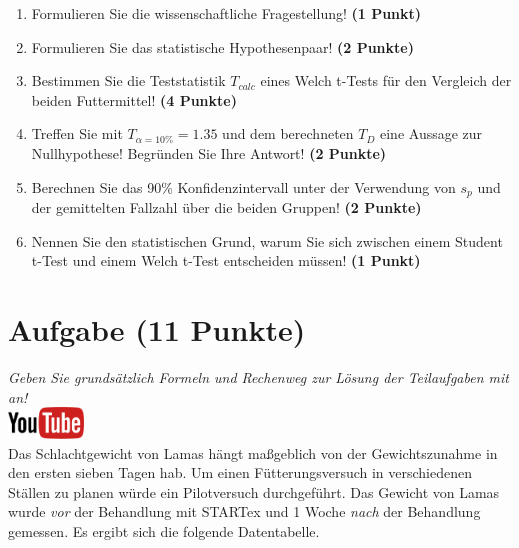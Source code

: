 \documentclass[a4paper, 9pt]{scrartcl}\usepackage[]{graphicx}\usepackage[]{xcolor}
\begin{document}
\begin{enumerate}
  \item Formulieren Sie die wissenschaftliche Fragestellung! \textbf{(1 Punkt)}
  \item Formulieren Sie das statistische Hypothesenpaar! \textbf{(2
      Punkte)}
  \item Bestimmen Sie die Teststatistik $T_{calc}$ eines Welch t-Tests f{\"u}r den
  Vergleich der beiden Futtermittel! \textbf{(4 Punkte)}
\item Treffen Sie mit $T_{\alpha = 10\%} = 1.35$ und dem berechneten $T_{D}$ eine Aussage
  zur Nullhypothese! Begr{\"u}nden Sie Ihre Antwort! \textbf{(2 Punkte)}
\item Berechnen Sie das 90\% Konfidenzintervall unter der
  Verwendung von $s_p$ und der gemittelten Fallzahl {\"u}ber die beiden Gruppen! \textbf{(2 Punkte)}
\item Nennen Sie den statistischen Grund, warum Sie sich zwischen einem Student t-Test und einem
  Welch t-Test entscheiden m{\"u}ssen! \textbf{(1 Punkt)}
\end{enumerate} 
\clearpage

\section{Aufgabe \hfill (11 Punkte)}

\textit{Geben Sie grunds{\"a}tzlich Formeln und Rechenweg zur L{\"o}sung der
  Teilaufgaben mit an!} \\[1Ex]

\hfill\href{https://youtu.be/QR90zyn0Iz8}{\includegraphics[width =
  2cm]{img/youtube}}\\[1Ex]



Das Schlachtgewicht von Lamas h{\"a}ngt ma{\ss}geblich von der
Gewichtszunahme in den ersten sieben Tagen hab. Um einen F{\"u}tterungsversuch
in verschiedenen St{\"a}llen zu planen w{\"u}rde ein Pilotversuch durchgef{\"u}hrt. Das
Gewicht von Lamas wurde \textit{vor} der Behandlung mit
STARTex und 1 Woche \textit{nach} der Behandlung gemessen. Es ergibt
sich die folgende Datentabelle.
\end{document}
